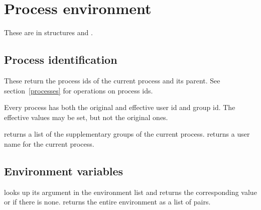 \section{Process environment}

These are in structures  and .

\subsection{Process identification}

\begin{protos}
\end{protos}
\noindent
These return the process ids of the current process and its parent.
See section~\ref{processes} for operations on process ids.

\begin{protos}
\end{protos}

\begin{protos}
\end{protos}
\noindent
Every process has both the original and effective user id and group id.
The effective values may be set, but not the original ones.

\begin{protos}
\end{protos}
\noindent
{} returns a list of the supplementary groups of the
 current process.
 returns a user name for the current process.



\subsection{Environment variables}

\begin{protos}
\end{protos}
\noindent
{} looks up its argument in the
 environment list and returns the corresponding value or 
 if there is none.
 returns the entire environment as a list of
  pairs.

